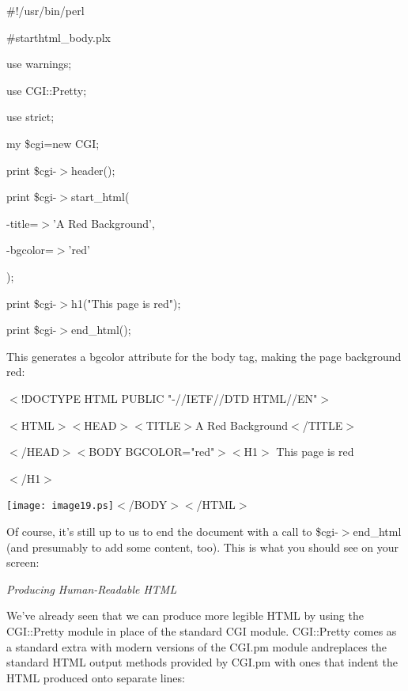 \documentclass[a4paper,11pt]{book}
\begin{document}
\noindent 

\noindent \#!/usr/bin/perl

\noindent \#starthtml\_body.plx

\noindent use warnings;

\noindent use CGI::Pretty;

\noindent use strict;

\noindent 

\noindent my \$cgi=new CGI;

\noindent 

\noindent print \$cgi-$>$header();

\noindent print \$cgi-$>$start\_html(

\noindent -title=$>$'A Red Background',

\noindent -bgcolor=$>$'red'

\noindent );

\noindent print \$cgi-$>$h1("This page is red");

\noindent print \$cgi-$>$end\_html();

\noindent 

\noindent This generates a bgcolor attribute for the body tag, making the page background red:

\noindent 

\noindent $<$!DOCTYPE HTML PUBLIC "-//IETF//DTD HTML//EN"$>$

\noindent $<$HTML$>$$<$HEAD$>$$<$TITLE$>$A Red Background$<$/TITLE$>$

\noindent $<$/HEAD$>$$<$BODY BGCOLOR="red"$>$$<$H1$>$ This page is red

\noindent $<$/H1$>$

\noindent \texttt{[image: image19.ps]}$<$/BODY$>$$<$/HTML$>$

\noindent 

\noindent Of course, it's still up to us to end the document with a call to \$cgi-$>$end\_html (and presumably to add some content, too). This is what you should see on your screen:

\noindent 

\noindent 

\noindent \textit{Producing Human-Readable HTML}

\noindent We've already seen that we can produce more legible HTML by using the CGI::Pretty module in place of the standard CGI module. CGI::Pretty comes as a standard extra with modern versions of the CGI.pm module andreplaces the standard HTML output methods provided by CGI.pm with ones that indent the HTML produced onto separate lines:
\end{document}

